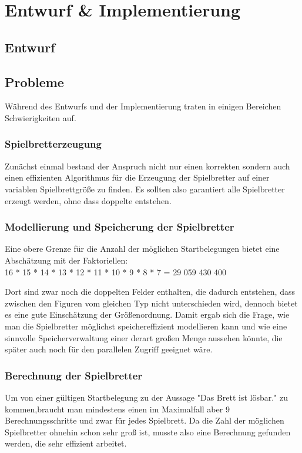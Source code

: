 \documentclass[
	12pt,
	a4paper,
	BCOR10mm,
	DIV14,
	listof=totoc,
	bibliography=totoc,
	headsepline
]{scrreprt}
\begin{document}
\chapter{Entwurf \& Implementierung}
\label{Entwurf}

\section{Entwurf}
\section{Probleme}
Während des Entwurfs und der Implementierung traten in einigen Bereichen Schwierigkeiten auf.
\subsection{Spielbretterzeugung}
Zunächst einmal bestand der Anspruch nicht nur einen korrekten sondern auch einen effizienten Algorithmus für die Erzeugung der Spielbretter auf einer variablen Spielbrettgröße zu finden.
Es sollten also garantiert alle Spielbretter erzeugt werden, ohne dass doppelte entstehen.

\subsection{Modellierung und Speicherung der Spielbretter}
Eine obere Grenze für die Anzahl der möglichen Startbelegungen bietet eine Abschätzung mit der Faktoriellen:\\
16 * 15 * 14 * 13 * 12 * 11 * 10 * 9 * 8 * 7 = 29 059 430 400

Dort sind zwar noch die doppelten Felder enthalten, die dadurch entstehen, dass zwischen den Figuren vom gleichen Typ nicht unterschieden wird, dennoch bietet es eine gute Einschätzung der Größenordnung.
Damit ergab sich die Frage, wie man die Spielbretter möglichst speichereffizient modellieren kann und wie eine sinnvolle Speicherverwaltung einer derart großen Menge aussehen könnte, die später auch noch für den parallelen Zugriff geeignet wäre.

\subsection{Berechnung der Spielbretter}
Um von einer gültigen Startbelegung zu der Aussage "Das Brett ist lösbar." zu kommen,braucht man mindestens einen im Maximalfall aber 9 Berechnungsschritte und zwar für jedes Spielbrett. Da die Zahl der möglichen Spielbretter ohnehin schon sehr groß ist, musste also eine Berechnung gefunden werden, die sehr effizient arbeitet.
\end{document}
